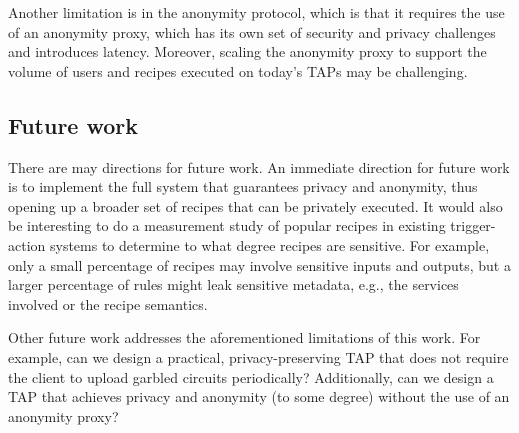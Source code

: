 Another limitation is in the anonymity protocol, which is that it requires the
use of an anonymity proxy, which has its own set of security and privacy
challenges and introduces latency. Moreover, scaling the anonymity proxy to
support the volume of users and recipes executed on today's TAPs may be
challenging.

\subsection{Future work}

There are may directions for future work. An immediate direction for future work
is to implement the full \sys system that guarantees privacy and anonymity, thus
opening up a broader set of recipes that can be privately executed.  It would
also be interesting to do a measurement study of popular recipes in existing
trigger-action systems to determine to what degree recipes are sensitive. For
example, only a small percentage of recipes may involve sensitive inputs and
outputs, but a larger percentage of rules might leak sensitive metadata, e.g.,
the services involved or the recipe semantics.

Other future work addresses the aforementioned limitations of this work. For
example, can we design a practical, privacy-preserving TAP that does not require
the client to upload garbled circuits periodically? Additionally, can we design
a TAP that achieves privacy and anonymity (to some degree) without the use of an
anonymity proxy?

